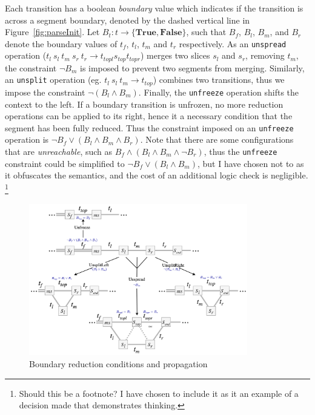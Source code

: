 \documentclass[12pt,a4paper,twoside,openright]{report}
\theoremstyle{definition}
\begin{document}
Each transition has a boolean \textit{boundary} value which indicates if the transition is across a segment boundary, denoted by the dashed vertical line in Figure~\ref{fig:parseInit}. 
Let $B_t : t \to \{\textbf{True}, \textbf{False}\}$, such that $B_f$, $B_l$, $B_m$, and $B_r$ denote the boundary values of $t_f$, $t_l$, $t_m$ and $t_r$ respectively. 
As an \texttt{unspread} operation ($t_l~s_l~t_m~s_r~t_r \to t_{topl} s_{top} t_{topr} $) merges two slices $s_l$ and $s_r$, removing $t_m$, the constraint $\lnot B_m$ is imposed to prevent two segments from merging. 
Similarly, an \texttt{unsplit} operation (eg. $t_l~s_l~t_m \to t_{top}$) combines two transitions, thus we impose the constraint $\lnot (B_l \wedge B_m)$. 
Finally, the \texttt{unfreeze} operation shifts the context to the left. If a boundary transition is unfrozen, no more reduction operations can be applied to its right, hence it a necessary condition that the segment has been fully reduced. Thus the constraint imposed on an \texttt{unfreeze} operation is $\lnot B_f \vee (B_l \wedge B_m \wedge B_r)$. Note that there are some configurations that are \textit{unreachable}, such as $B_f \wedge (B_l \wedge B_m \wedge \lnot B_r)$, thus the \texttt{unfreeze} constraint could be simplified to $\lnot B_f \vee (B_l \wedge B_m)$, but I have chosen not to as it obfuscates the semantics, and the cost of an additional logic check is negligible. \footnote{Should this be a footnote? I have chosen to include it as it an example of a decision made that demonstrates thinking.}

\begin{figure}[h]
  \centering
  \includegraphics[width=0.85\textwidth]{impl/boundarydiagram/diag.png}
  \caption{Boundary reduction conditions and propagation}
  \label{fig:parseStateOptions}
\end{figure}
\end{document}
